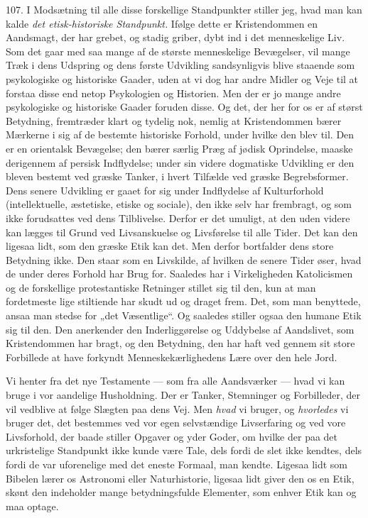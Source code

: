 \documentclass[12pt,a4paper,openany]{book}
\newcommand{\opage}[1]{\marginnote{\footnotesize\textit{[#1]}}}
\begin{document}
107. I Modsætning til alle disse forskellige Standpunkter stiller jeg,
hvad man kan kalde \textit{det etisk-historiske Standpunkt.} Ifølge
\opage{236}dette er Kristendommen en Aandsmagt, der har grebet, og
stadig griber, dybt ind i det menneskelige Liv. Som det gaar med saa
mange af de største menneskelige Bevægelser, vil mange Træk i dens
Udspring og dens første Udvikling sandsynligvis blive staaende som
psykologiske og historiske Gaader, uden at vi dog har andre Midler og
Veje til at forstaa disse end netop Psykologien og Historien. Men der er
jo mange andre psykologiske og historiske Gaader foruden disse. Og det,
der her for os er af størst Betydning, fremtræder klart og tydelig nok,
nemlig at Kristendommen bærer Mærkerne i sig af de bestemte historiske
Forhold, under hvilke den blev til. Den er en orientalsk Bevægelse; den
bærer særlig Præg af jødisk Oprindelse, maaske derigennem af persisk
Indflydelse; under sin videre dogmatiske Udvikling er den bleven bestemt
ved græske Tanker, i hvert Tilfælde ved græske Begrebsformer. Dens
senere Udvikling er gaaet for sig under Indflydelse af Kulturforhold
(intellektuelle, æstetiske, etiske og sociale), den ikke selv har
frembragt, og som ikke forudsattes ved dens Tilblivelse. Derfor er det
umuligt, at den uden videre kan lægges til Grund ved Livsanskuelse og
Livsførelse til alle Tider. Det kan den ligesaa lidt, som den græske
Etik kan det. Men derfor bortfalder dens store Betydning ikke. Den staar
som en Livskilde, af hvilken de senere Tider øser, hvad de under deres
Forhold har Brug for. Saaledes har i Virkeligheden Katolicismen og de
forskellige protestantiske Retninger stillet sig til den, kun at man
fordetmeste lige stiltiende har skudt ud og draget frem. Det, som man
benyttede, ansaa man stedse for „det Væsentlige“. Og saaledes stiller
ogsaa den humane Etik sig til den. Den anerkender den Inderliggørelse og
Uddybelse af Aandslivet, som Kristendommen har bragt, og den Betydning,
den har haft ved gennem sit store Forbillede at have forkyndt
Menneskekærlighedens Lære over den hele Jord.

Vi henter fra det nye Testamente --- som fra alle Aandsværker --- hvad
vi kan bruge i vor aandelige Husholdning. Der er Tanker, Stemninger og
Forbilleder, der vil vedblive at følge Slægten paa dens Vej. Men
\textit{hvad} vi bruger, og \textit{hvorledes} vi bruger det, det
bestemmes ved vor egen selvstændige Livserfaring og ved vore
Livsforhold, der baade stiller Opgaver og yder Goder, om hvilke der paa
det urkristelige Standpunkt ikke kunde være Tale, dels fordi de slet
ikke kendtes, dels fordi de var uforenelige med det eneste Formaal, man
kendte. Ligesaa lidt som Bibelen lærer os Astronomi eller Naturhistorie,
ligesaa lidt giver
\opage{237}den os en Etik, skønt den indeholder mange betydningsfulde
Elementer, som enhver Etik kan og maa optage.
\end{document}
